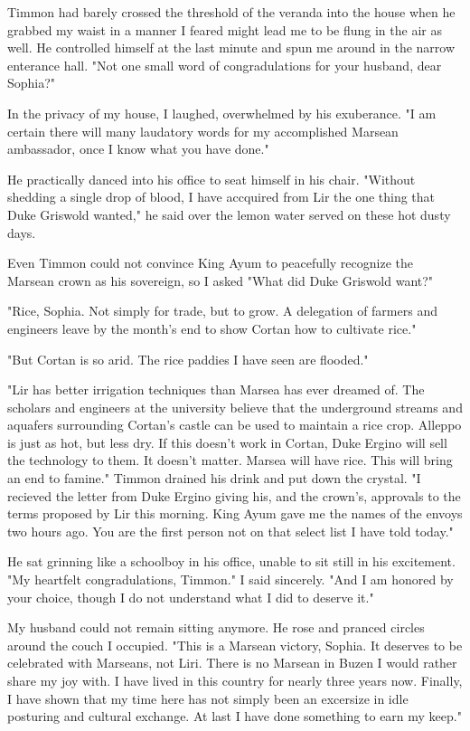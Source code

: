 \documentclass{article}
\begin{document}
Timmon had barely crossed the threshold of the veranda into the house when he grabbed my waist in a manner I feared might lead me to be flung in the air as well. He controlled himself at the last minute and spun me around in the narrow enterance hall. "Not one small word of congradulations for your husband, dear Sophia?"

In the privacy of my house, I laughed, overwhelmed by his exuberance. "I am certain there will many laudatory words for my accomplished Marsean ambassador, once I know what you have done."

He practically danced into his office to seat himself in his chair. "Without shedding a single drop of blood, I have accquired from Lir the one thing that Duke Griswold wanted," he said over the lemon water served on these hot dusty days. 

Even Timmon could not convince King Ayum to peacefully recognize the Marsean crown as his sovereign, so I asked "What did Duke Griswold want?"

"Rice, Sophia. Not simply for trade, but to grow. A delegation of farmers and engineers leave by the month's end to show Cortan how to cultivate rice."

"But Cortan is so arid. The rice paddies I have seen are flooded." 

"Lir has better irrigation techniques than Marsea has ever dreamed of. The scholars and engineers at the university believe that the underground streams and aquafers surrounding Cortan's castle can be used to maintain a rice crop. Alleppo is just as hot, but less dry. If this doesn't work in Cortan, Duke Ergino will sell the technology to them. It doesn't matter. Marsea will have rice. This will bring an end to famine." Timmon drained his drink and put down the crystal. "I recieved the letter from Duke Ergino giving his, and the crown's, approvals to the terms proposed by Lir this morning. King Ayum gave me the names of the envoys two hours ago. You are the first person not on that select list I have told today."

He sat grinning like a schoolboy in his office, unable to sit still in his excitement. "My heartfelt congradulations, Timmon." I said sincerely. "And I am honored by your choice, though I do not understand what I did to deserve it."

My husband could not remain sitting anymore. He rose and pranced circles around the couch I occupied. "This is a Marsean victory, Sophia. It deserves to be celebrated with Marseans, not Liri. There is no Marsean in Buzen I would rather share my joy with. I have lived in this country for nearly three years now. Finally, I have shown that my time here has not simply been an excersize in idle posturing and cultural exchange. At last I have done something to earn my keep."
\end{document}
